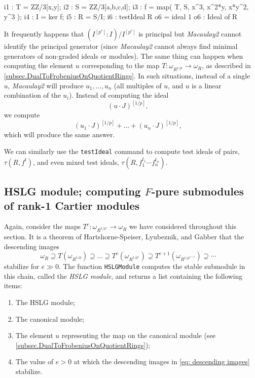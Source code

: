 \documentclass{amsart}
\begin{document}
\medskip
{\small
\begin{MyVerbatim}
i1 : T = ZZ/3[x,y];
i2 : S = ZZ/3[a,b,c,d];
i3 : f = map( T, S, { x^3, x^2*y, x*y^2, y^3 } );
i4 : I = ker f;
i5 : R = S/I;
i6 : testIdeal R
o6 = ideal 1
o6 : Ideal of R
\end{MyVerbatim}
}\medskip


\begin{remark}
   It frequently happens that $(I^{[p^e]} : I)/I^{[p^e]}$ is principal but \emph{Macaulay2} cannot identify the principal generator (since \emph{Macaulay2} cannot always find minimal generators of non-graded ideals or modules).
   The same thing can happen when computing the element $u$ corresponding to the map $T : \omega_{R^{1/p}} \to \omega_R$, as described in \autoref{subsec.DualToFrobeniusOnQuotientRings}.
   In such situations, instead of a single $u$, \emph{Macaulay2} will produce $u_1, \dots, u_n$ (all multiples of $u$, and $u$ is a linear combination of the $u_i$).  Instead of computing the ideal
\[
(u \cdot J)^{[1/p]},
\]
we compute
\[
(u_1 \cdot J)^{[1/p]} + \dots + (u_n \cdot J)^{[1/p]},
\]
which will produce the same answer.
\end{remark}

We can similarly use the \texttt{testIdeal} command to compute test ideals of pairs, $\tau(R, f^t)$, and even mixed test ideals, $\tau(R, f_1^{t_1} \cdots f_n^{t_n})$.

\subsection{HSLG module; computing $F$-pure submodules of rank-1 Cartier modules}

Again, consider the maps $T^e : \omega_{R^{1/p^e}} \to \omega_R$ we have considered throughout this section.  It is a theorem of Hartshorne-Speiser, Lyubeznik, and Gabber \cite{HartshorneSpeiserLocalCohomologyInCharacteristicP,LyubeznikFModulesApplicationsToLocalCohomology,Gabber.tStruc} that the descending images
\begin{equation}\label{eq: descending images}
\omega_R \supseteq T(\omega_{R^{1/p}}) \supseteq \dots \supseteq T^e(\omega_{R^{1/p^e}}) \supseteq T^{e+1}(\omega_{R^{1/p^{e+1}}}) \supseteq \cdots
\end{equation}
stabilize for $e \gg 0$.
The function \texttt{HSLGModule} computes the stable submodule in this chain, called the \emph{HSLG module}, and returns a list containing the following items:
\begin{enumerate}[(1)]
   \item The HSLG module;
   \item The canonical module;
   \item The element $u$ representing the map on the canonical module (see
   \autoref{subsec.DualToFrobeniusOnQuotientRings});
   \item The value of $e > 0$ at which the descending images in \eqref{eq: descending images} stabilize.
\end{enumerate}
\end{document}
